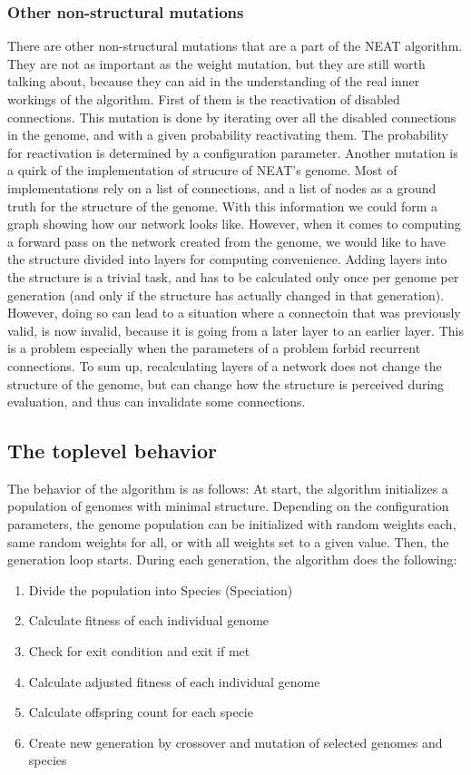 \documentclass{article}
\begin{document}
\subsubsection{Other non-structural mutations}
There are other non-structural mutations that are a part of the NEAT algorithm. They are not as important as the weight mutation, but they are still worth
talking about, because they can aid in the understanding of the real inner workings of the algorithm.
First of them is the reactivation of disabled connections. This mutation is done by iterating over all the disabled connections in the genome, and with a given
probability reactivating them. The probability for reactivation is determined by a configuration parameter.
Another mutation is a quirk of the implementation of strucure of NEAT's genome. Most of implementations rely on a list of connections, and a list of nodes as a 
ground truth for the structure of the genome. With this information we could form a graph showing how our network looks like. However, when it comes to 
computing a forward pass on the network created from the genome, we would like to have the structure divided into layers for computing convenience.
Adding layers into the structure is a trivial task, and has to be calculated only once per genome per generation (and only if the structure has actually 
changed in that generation). However, doing so can lead to a situation where a connectoin that was previously valid, is now invalid, because it
is going from a later layer to an earlier layer. This is a problem especially when the parameters of a problem forbid recurrent connections. To sum up, 
recalculating layers of a network does not change the structure of the genome, but can change how the structure is perceived during evaluation, and thus
can invalidate some connections.

\subsection{The toplevel behavior}
The behavior of the algorithm is as follows: 
At start, the algorithm initializes a population of genomes with minimal structure. Depending on the configuration parameters,
the genome population can be initialized with random weights each, same random weights for all, or with all weights set to a given value.
Then, the generation loop starts. During each generation, the algorithm does the following:
    \begin{enumerate}
        \item Divide the population into Species (Speciation)
        \item Calculate fitness of each individual genome
        \item Check for exit condition and exit if met
        \item Calculate adjusted fitness of each individual genome
        \item Calculate offspring count for each specie
        \item Create new generation by crossover and mutation of selected genomes and species
    \end{enumerate}
\end{document}
